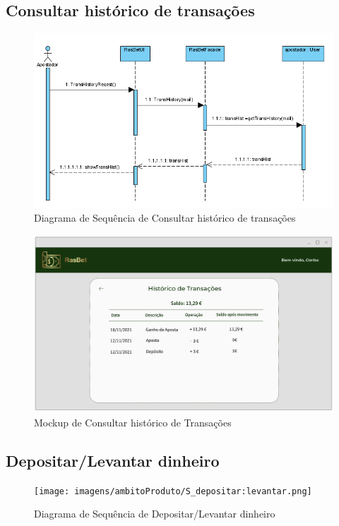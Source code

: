 \subsection{Consultar histórico de transações}
\begin{figure}[H]
\centering
\includegraphics[width=1\textwidth]{imagens/ambitoProduto/STransHistory.png}
\caption{Diagrama de Sequência de Consultar histórico de transações}
\end{figure}
\begin{figure}[H]
\centering
\includegraphics[width=1\textwidth]{imagens/ambitoProduto/Mockups/M_histTransacoes.png}
\caption{Mockup de Consultar histórico de Transações}
\end{figure}

\subsection{Depositar/Levantar dinheiro}
\begin{figure}[H]
\centering
\texttt{[image: imagens/ambitoProduto/S\_depositar:levantar.png]}
\caption{Diagrama de Sequência de Depositar/Levantar dinheiro}
\end{figure}

